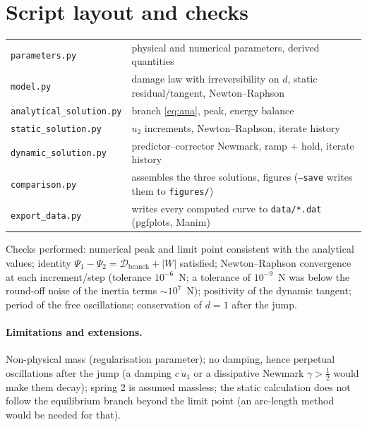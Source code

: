 \documentclass[11pt,a4paper]{article}
\begin{document}
\section{Script layout and checks}
\begin{center}
\begin{tabular}{ll}
\toprule
\texttt{parameters.py} & physical and numerical parameters, derived quantities\\
\texttt{model.py} & damage law with irreversibility on $d$, static residual/tangent, Newton--Raphson\\
\texttt{analytical\_solution.py} & branch \eqref{eq:ana}, peak, energy balance\\
\texttt{static\_solution.py} & $u_2$ increments, Newton--Raphson, iterate history\\
\texttt{dynamic\_solution.py} & predictor--corrector Newmark, ramp + hold, iterate history\\
\texttt{comparison.py} & assembles the three solutions, figures (\texttt{--save} writes them to \texttt{figures/})\\
\texttt{export\_data.py} & writes every computed curve to \texttt{data/*.dat} (pgfplots, Manim)\\
\bottomrule
\end{tabular}
\end{center}
Checks performed: numerical peak and limit point consistent with the analytical values;
identity $\Psi_1-\Psi_2 = \mathcal D_{\text{branch}}+|W|$ satisfied; Newton--Raphson convergence
at each increment/step (tolerance $10^{-6}$~N; a tolerance of $10^{-9}$~N was below the
round-off noise of the inertia terms $\sim10^7$~N); positivity of the dynamic tangent; period
of the free oscillations; conservation of $d=1$ after the jump.

\paragraph{Limitations and extensions.}
Non-physical mass (regularisation parameter); no damping, hence perpetual oscillations after
the jump (a damping $c\,\dot u_1$ or a dissipative Newmark $\gamma>\tfrac12$ would make them
decay); spring 2 is assumed massless; the static calculation does not follow the equilibrium
branch beyond the limit point (an arc-length method would be needed for that).
\end{document}
